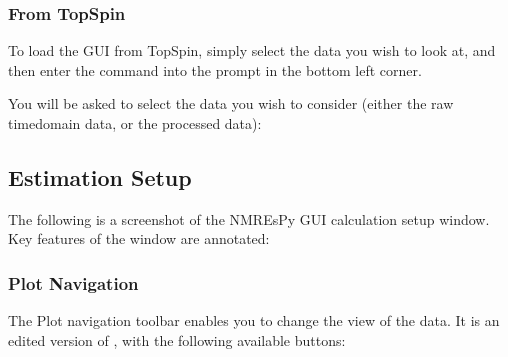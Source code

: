 \documentclass[letterpaper,10pt,english]{sphinxmanual}
\let\sphinxpxdimen\pdfpxdimen\else\newdimen\sphinxpxdimen
\begin{document}
\subsubsection{From TopSpin}
\label{\detokenize{gui/usage/loading:from-topspin}}
\sphinxAtStartPar
To load the GUI from TopSpin, simply select the data you wish to look at,
and then enter the command  into the prompt in the bottom left
corner.

\sphinxAtStartPar
You will be asked to select the data you wish to consider (either the
raw time\sphinxhyphen{}domain data, or the processed data):

\noindent{\hspace*{\fill}\sphinxincludegraphics[width=400\sphinxpxdimen]{{datatype}.png}\hspace*{\fill}}




\subsection{Estimation Set\sphinxhyphen{}up}
\label{\detokenize{gui/usage/setup:estimation-set-up}}\label{\detokenize{gui/usage/setup::doc}}
\sphinxAtStartPar
The following is a screenshot of the NMR\sphinxhyphen{}EsPy GUI calculation set\sphinxhyphen{}up window.
Key features of the window are annotated:



\subsubsection{Plot Navigation}
\label{\detokenize{gui/usage/setup:plot-navigation}}
\sphinxAtStartPar
The Plot navigation toolbar enables you to change the view of the data.
It is an edited version of
,
with the following available buttons:
\end{document}
